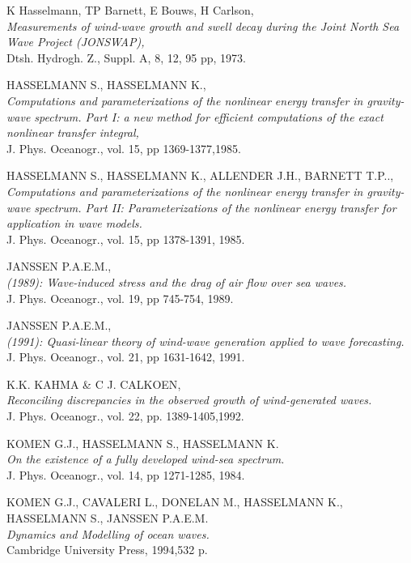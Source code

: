 \begin{thebibliography}{99}
 {\sc K Hasselmann, TP Barnett, E Bouws, H Carlson},\\  
{\em  Measurements of wind-wave growth and swell decay during the Joint North Sea Wave Project (JONSWAP),} \\
 Dtsh. Hydrogh. Z., Suppl. A, 8, 12, 95 pp, 1973.

 {\sc HASSELMANN S., HASSELMANN K.},\\  
{\em Computations and parameterizations of the nonlinear energy
transfer in gravity-wave spectrum. Part I: a new method for efficient computations of the exact nonlinear transfer integral,}\\
 J. Phys. Oceanogr., vol. 15, pp 1369-1377,1985.

 {\sc HASSELMANN S., HASSELMANN K., ALLENDER J.H., BARNETT T.P..},\\  
{\em Computations and parameterizations of the nonlinear energy transfer in gravity-wave spectrum. Part II: Parameterizations of the nonlinear energy transfer for application in wave models.} \\
J. Phys. Oceanogr., vol. 15, pp 1378-1391, 1985.

 {\sc JANSSEN P.A.E.M.},\\  
{\em   (1989): Wave-induced stress and the drag of air flow over sea waves.}\\
 J. Phys. Oceanogr., vol. 19, pp 745-754, 1989.

 {\sc JANSSEN P.A.E.M.},\\  
{\em   (1991): Quasi-linear theory of wind-wave generation applied to wave forecasting. }\\
J. Phys. Oceanogr., vol. 21, pp 1631-1642, 1991.

 {\sc   K.K. KAHMA \& C J. CALKOEN},\\  
{\em Reconciling discrepancies in the observed growth of wind-generated waves.}\\
 J. Phys. Oceanogr., vol. 22, pp. 1389-1405,1992.

 {\sc  KOMEN G.J., HASSELMANN S., HASSELMANN K.}\\
{\em On the existence of a fully developed wind-sea spectrum. }\\
J. Phys. Oceanogr., vol. 14, pp 1271-1285, 1984.

 {\sc  KOMEN G.J., CAVALERI L., DONELAN M., HASSELMANN K., HASSELMANN S., JANSSEN P.A.E.M.}\\
{\em Dynamics and Modelling of ocean waves.}\\
 Cambridge University Press, 1994,532 p.


\end{thebibliography}
